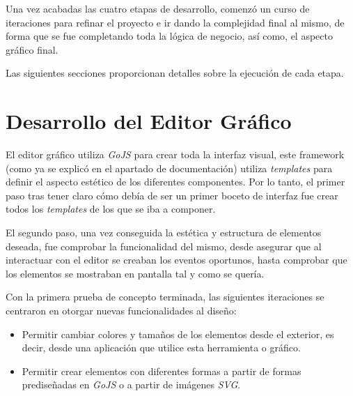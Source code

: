 Una vez acabadas las cuatro etapas de desarrollo, comenzó un curso de iteraciones para refinar el proyecto e ir dando la complejidad final al mismo, de forma que se fue completando toda la lógica de negocio, así como, el aspecto gráfico final.

Las siguientes secciones proporcionan detalles sobre la ejecución de cada etapa.

\section{Desarrollo del Editor Gráfico}

El editor gráfico utiliza \emph{GoJS} para crear toda la interfaz visual, este framework (como ya se explicó en el apartado de documentación) utiliza \emph{templates} para definir el aspecto estético de los diferentes componentes. Por lo tanto, el primer paso tras tener claro cómo debía de ser un primer boceto de interfaz fue crear todos los \emph{templates} de los que se iba a componer.

El segundo paso, una vez conseguida la estética y estructura de elementos deseada, fue comprobar la funcionalidad del mismo, desde asegurar que al interactuar con el editor se creaban los eventos oportunos, hasta comprobar que los elementos se mostraban en pantalla tal y como se quería.



Con la primera prueba de concepto terminada, las siguientes iteraciones se centraron en otorgar nuevas funcionalidades al diseño:
\begin{itemize}
	\item Permitir cambiar colores y tamaños de los elementos desde el exterior, es decir, desde una aplicación que utilice esta herramienta o gráfico.
	\item Permitir crear elementos con diferentes formas a partir de formas prediseñadas en \emph{GoJS} o a partir de imágenes \emph{SVG}\cite{svg}.
\end{itemize}

